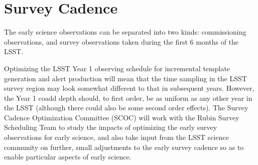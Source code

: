 \section{Survey Cadence}


The early science observations can be separated into two kinds: commissioning observations, and survey observations taken during the first 6 months of the LSST.

Optimizing the LSST Year 1 observing schedule for incremental template generation and alert production will mean that the time sampling in the LSST survey region may look somewhat different to that in subsequent years.
However, the Year 1 coadd depth should, to first order, be as uniform as any other year in the LSST (although there could also be some second order effects).
The Survey Cadence Optimization Committee (SCOC) will work with the Rubin Survey Scheduling Team to study the impacts of optimizing the early survey observations for early science, and also take input from the LSST science community on further, small adjustments to the early survey cadence so as to enable particular aspects of early science.
